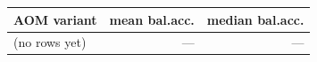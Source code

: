 \begin{tabular}{lrr}
\toprule
AOM variant & mean bal.acc. & median bal.acc. \\
\midrule
(no rows yet) & --- & --- \\
\bottomrule
\end{tabular}
